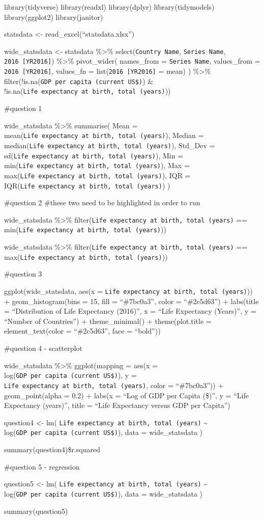\documentclass[
]{article}
\author{}
\date{\vspace{-2.5em}}
\begin{document}
library(tidyverse) library(readxl) library(dplyr) library(tidymodels)
library(ggplot2) library(janitor)

statsdata \textless- read\_excel(``statsdata.xlsx'')

wide\_statsdata \textless- statsdata \%\textgreater\%
select(\texttt{Country\ Name}, \texttt{Series\ Name},
\texttt{2016\ {[}YR2016{]}}) \%\textgreater\% pivot\_wider( names\_from
= \texttt{Series\ Name}, values\_from = \texttt{2016\ {[}YR2016{]}},
values\_fn = list(\texttt{2016\ {[}YR2016{]}} = mean) ) \%\textgreater\%
filter(!is.na(\texttt{GDP\ per\ capita\ (current\ US\$)}) \&
!is.na(\texttt{Life\ expectancy\ at\ birth,\ total\ (years)}))

\#question 1

wide\_statsdata \%\textgreater\% summarise( Mean =
mean(\texttt{Life\ expectancy\ at\ birth,\ total\ (years)}), Median =
median(\texttt{Life\ expectancy\ at\ birth,\ total\ (years)}), Std\_Dev
= sd(\texttt{Life\ expectancy\ at\ birth,\ total\ (years)}), Min =
min(\texttt{Life\ expectancy\ at\ birth,\ total\ (years)}), Max =
max(\texttt{Life\ expectancy\ at\ birth,\ total\ (years)}), IQR =
IQR(\texttt{Life\ expectancy\ at\ birth,\ total\ (years)}) )

\#question 2 \#these two need to be highlighted in order to run

wide\_statsdata \%\textgreater\%
filter(\texttt{Life\ expectancy\ at\ birth,\ total\ (years)} ==
min(\texttt{Life\ expectancy\ at\ birth,\ total\ (years)}))

wide\_statsdata \%\textgreater\%
filter(\texttt{Life\ expectancy\ at\ birth,\ total\ (years)} ==
max(\texttt{Life\ expectancy\ at\ birth,\ total\ (years)}))

\#question 3

ggplot(wide\_statsdata, aes(x =
\texttt{Life\ expectancy\ at\ birth,\ total\ (years)})) +
geom\_histogram(bins = 15, fill = ``\#7bc0a3'', color = ``\#2c5d63'') +
labs(title = ``Distribution of Life Expectancy (2016)'', x = ``Life
Expectancy (Years)'', y = ``Number of Countries'') + theme\_minimal() +
theme(plot.title = element\_text(color = ``\#2c5d63'', face = ``bold''))

\#question 4 - scatterplot

wide\_statsdata \%\textgreater\% ggplot(mapping = aes(x =
log(\texttt{GDP\ per\ capita\ (current\ US\$)}), y =
\texttt{Life\ expectancy\ at\ birth,\ total\ (years)}, color =
``\#7bc0a3'')) + geom\_point(alpha = 0.2) + labs(x = ``Log of GDP per
Capita (\$)'', y = ``Life Expectancy (years)'', title = ``Life
Expectancy versus GDP per Capita'')

question4 \textless- lm(
\texttt{Life\ expectancy\ at\ birth,\ total\ (years)} \textasciitilde{}
log(\texttt{GDP\ per\ capita\ (current\ US\$)}), data = wide\_statsdata
)

summary(question4)\$r.squared

\#question 5 - regression

question5 \textless- lm(
\texttt{Life\ expectancy\ at\ birth,\ total\ (years)} \textasciitilde{}
log(\texttt{GDP\ per\ capita\ (current\ US\$)}), data = wide\_statsdata
)

summary(question5)
\end{document}
